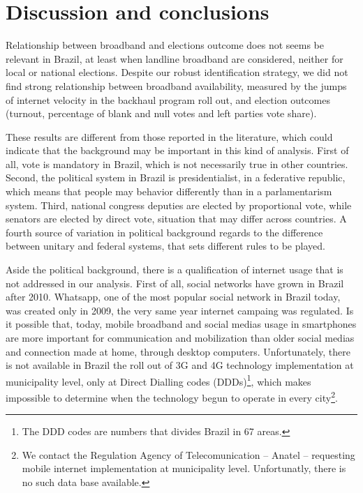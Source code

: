 \documentclass[12pt,]{article}
\let\rmarkdownfootnote\footnote%
\def\footnote{\protect\rmarkdownfootnote}
\begin{document}
\hypertarget{discussion-and-conclusions}{%
\section{Discussion and conclusions}\label{discussion-and-conclusions}}

Relationship between broadband and elections outcome does not seems be
relevant in Brazil, at least when landline broadband are considered,
neither for local or national elections. Despite our robust
identification strategy, we did not find strong relationship between
broadband availability, measured by the jumps of internet velocity in
the backhaul program roll out, and election outcomes (turnout,
percentage of blank and null votes and left parties vote share).

These results are different from those reported in the literature, which
could indicate that the background may be important in this kind of
analysis. First of all, vote is mandatory in Brazil, which is not
necessarily true in other countries. Second, the political system in
Brazil is presidentialist, in a federative republic, which means that
people may behavior differently than in a parlamentarism system. Third,
national congress deputies are elected by proportional vote, while
senators are elected by direct vote, situation that may differ across
countries. A fourth source of variation in political background regards
to the difference between unitary and federal systems, that sets
different rules to be played.

Aside the political background, there is a qualification of internet
usage that is not addressed in our analysis. First of all, social
networks have grown in Brazil after 2010. Whatsapp, one of the most
popular social network in Brazil today, was created only in 2009, the
very same year internet campaing was regulated. Is it possible that,
today, mobile broadband and social medias usage in smartphones are more
important for communication and mobilization than older social medias
and connection made at home, through desktop computers. Unfortunately,
there is not available in Brazil the roll out of 3G and 4G technology
implementation at municipality level, only at Direct Dialling codes
(DDDs)\footnote{The DDD codes are numbers that divides Brazil in 67
  areas.}, which makes impossible to determine when the technology begun
to operate in every city\footnote{We contact the Regulation Agency of
  Telecomunication -- Anatel -- requesting mobile internet
  implementation at municipality level. Unfortunatly, there is no such
  data base available.}.
\end{document}
